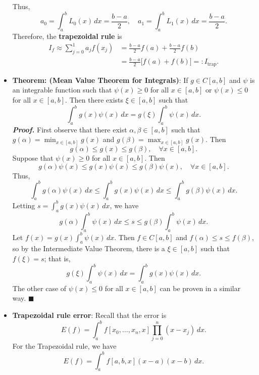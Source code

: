 \documentclass{report}
\begin{document}
\begin{itemize}
$$            $$
            Thus,
            $$
            a_0 = \int_a^b L_0(x)\,dx = \frac{b - a}{2}, \quad 
            a_1 = \int_a^b L_1(x)\,dx = \frac{b - a}{2}.
            $$
            Therefore, the \textbf{trapezoidal rule} is
            \begin{align*}
                I_f \approx \sum_{j=0}^1 a_j f(x_j) 
&= \frac{b - a}{2} f(a) + \frac{b - a}{2} f(b)\\
&= \frac{b - a}{2} \bigl[f(a) + f(b)\bigr] =: I_{\mathrm{trap}}.
            \end{align*}
        \item \textbf{Theorem: (Mean Value Theorem for Integrals)}: If $g \in C[a,b]$ and $\psi$ is an integrable function such that $\psi(x) \geq 0$ for all $x \in [a,b]$ or $\psi(x) \leq 0$ for all $x \in [a,b].$ Then there exists $\xi \in [a,b]$ such that
            $$
            \int_a^b g(x) \psi(x)\,dx = g(\xi) \int_a^b \psi(x)\,dx.
            $$
            \bigbreak \noindent 
            \textbf{\textit{Proof.}} 
            First observe that there exist $\alpha, \beta \in [a,b]$ such that $g(\alpha) = \min_{x \in [a,b]} g(x)$ and $g(\beta) = \max_{x \in [a,b]} g(x)$. Then
            $$
            g(\alpha) \leq g(x) \leq g(\beta), \quad \forall x \in [a,b].
            $$
            Suppose that $\psi(x) \geq 0$ for all $x \in [a,b]$. Then
            $$
            g(\alpha)\psi(x) \leq g(x)\psi(x) \leq g(\beta)\psi(x), \quad \forall x \in [a,b].
            $$
            Thus,
            $$
            \int_a^b g(\alpha)\psi(x)\,dx \leq \int_a^b g(x)\psi(x)\,dx \leq \int_a^b g(\beta)\psi(x)\,dx.
            $$
            Letting $s = \int_a^b g(x)\psi(x)\,dx$, we have
           $$
            g(\alpha) \int_a^b \psi(x)\,dx \leq s \leq g(\beta) \int_a^b \psi(x)\,dx.
            $$
            Let $f(x) = g(x) \int_a^b \psi(x)\,dx$. Then $f \in C[a,b]$ and $f(\alpha) \leq s \leq f(\beta)$, so by the Intermediate Value Theorem, there is a $\xi \in [a,b]$ such that $f(\xi) = s$; that is,
            $$
            g(\xi) \int_a^b \psi(x)\,dx = \int_a^b g(x) \psi(x)\,dx.
            $$
            The other case of $\psi(x) \leq 0$ for all $x \in [a,b]$ can be proven in a similar way. $\blacksquare$
        \item \textbf{Trapezoidal rule error}:
            Recall that the error is
            $$
            E(f) = \int_a^b f[x_0,\ldots,x_n,x] \prod_{j=0}^n (x - x_j)\,dx.
            $$
            For the Trapezoidal rule, we have
            $$
            E(f) = \int_a^b f[a,b,x] (x - a)(x - b)\,dx.
$$
\end{itemize}
\end{document}
